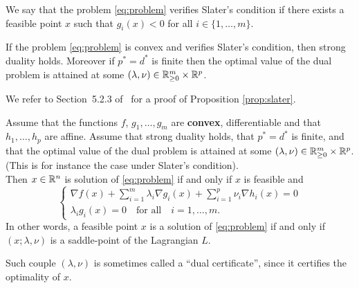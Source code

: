\documentclass[11pt,nocut]{article}
\begin{document}
\begin{definition}
	We say that the problem \eqref{eq:problem} verifies Slater's condition if there exists a feasible point $x$ such that $g_i(x) < 0$ for all $i \in \{1, \dots, m\}$.
\end{definition}

\begin{proposition}\label{prop:slater}
	If the problem \eqref{eq:problem} is convex and verifies Slater's condition, then strong duality holds.
	Moreover if $p^*=d^*$ is finite then the optimal value of the dual problem is attained at some $(\lambda,\nu) \in \mathbb{R}_{\geq 0}^m \times \mathbb{R}^p$.
\end{proposition}
We refer to Section~5.2.3 of~\cite{boyd2004convex} for a proof of Proposition \ref{prop:slater}.



\begin{theorem}\label{th:kuhn_tucker}
	Assume that the functions $f$, $g_1, \dots, g_m$ are \textbf{convex}, differentiable and that $h_1, \dots, h_p$ are affine. Assume that strong duality holds, that $p^*=d^*$ is finite, and that the optimal value of the dual problem is attained at some $(\lambda,\nu) \in \mathbb{R}_{\geq 0}^m \times \mathbb{R}^p$. (This is for instance the case under Slater's condition).
	\\

	Then $x \in \mathbb{R}^n$ is solution of \eqref{eq:problem} if and only if $x$ is feasible and
	\begin{equation}\label{eq:kkt}
		\begin{cases}
			\displaystyle \nabla f(x) + \sum_{i=1}^m \lambda_i \nabla g_i(x) + \sum_{i=1}^p \nu_i \nabla h_i(x) = 0 \\
		\lambda_i g_i(x) = 0 \quad \text{for all} \quad i=1, \dots, m.
		\end{cases}
	\end{equation}
	In other words, a feasible point $x$ is a solution of \eqref{eq:problem} if and only if $(x; \lambda, \nu)$ is a saddle-point of the Lagrangian $L$.
\end{theorem}

\noindent Such couple $(\lambda,\nu)$ is sometimes called a ``dual certificate'', since it certifies the optimality of $x$.
\\
\end{document}
